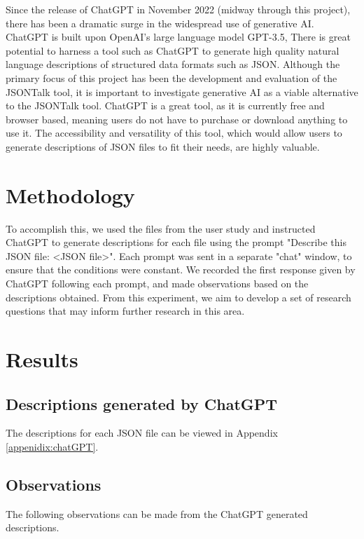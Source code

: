\documentclass{l4proj}
\begin{document}
Since the release of ChatGPT \cite{chatgpt} in November 2022 (midway through this project), there has been a dramatic surge in the widespread use of generative AI. ChatGPT is built upon OpenAI's large language model GPT-3.5,  There is great potential to harness a tool such as ChatGPT to generate high quality natural language descriptions of structured data formats such as JSON. Although the primary focus of this project has been the development and evaluation of the JSONTalk tool, it is important to investigate generative AI as a viable alternative to the JSONTalk tool. ChatGPT is a great tool, as it is currently free and browser based, meaning users do not have to purchase or download anything to use it. The accessibility and versatility of this tool, which would allow users to generate descriptions of JSON files to fit their needs, are highly valuable. 

\section{Methodology}

To accomplish this, we used the files from the user study and instructed ChatGPT to generate descriptions for each file using the prompt "Describe this JSON file: <JSON file>". Each prompt was sent in a separate "chat" window, to ensure that the conditions were constant. We recorded the first response given by ChatGPT following each prompt, and made observations based on the descriptions obtained. From this experiment, we aim to develop a set of research questions that may inform further research in this area.


\section{Results}

\subsection{Descriptions generated by ChatGPT}

The descriptions for each JSON file can be viewed in Appendix \ref{appenidix:chatGPT}.

\subsection{Observations}

The following observations can be made from the ChatGPT generated descriptions.
\end{document}
